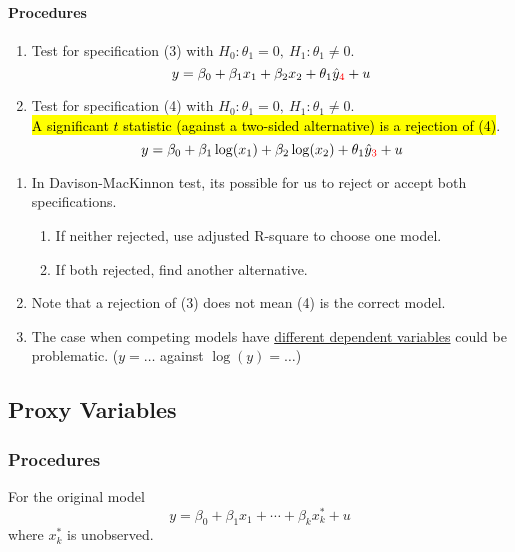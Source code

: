 \documentclass[]{article}
\begin{document}
			\paragraph{Procedures}
			\begin{enumerate}
				\item Test for specification (3) with $H_0: \theta_1=0,\ H_1: \theta_1 \neq 0$.
					\begin{equation}
						y = \beta_0 + \beta_1 x_1 + \beta_2 x_2 + \theta_1 \hat{y}_{\textcolor{red}{4}} + u
					\end{equation}
				\item Test for specification (4) with $H_0: \theta_1=0,\ H_1: \theta_1 \neq 0$. \\ \hl{A significant $t$ statistic (against a two-sided alternative) is a rejection of (4)}.
					\begin{equation}
						y = \beta_0 + \beta_1 \log(x_1) + \beta_2 \log(x_2) + \theta_1 \hat{y}_{\textcolor{red}{3}} + u
					\end{equation}
			\end{enumerate}
			
			\begin{remark}[Porblems] \quad
				\begin{enumerate}
					\item In Davison-MacKinnon test, its possible for us to reject or accept both specifications.
					\begin{enumerate}
						\item If neither rejected, use adjusted R-square to choose one model.
						\item If both rejected, find another alternative.
					\end{enumerate}
					\item Note that a rejection of (3) does not mean (4) is the correct model.
					\item The case when competing models have \ul{different dependent variables} could be problematic. ($y = \dots $ against $\log(y) = \dots$)
				\end{enumerate}
			\end{remark}
		\subsection{Proxy Variables}
			\subsubsection{Procedures}
				\par For the original model
				\begin{equation}
					y = \beta_0 + \beta_1 x_1 + \cdots + \beta_k x_k^{*} + u
				\end{equation}
				where $x_k^{*}$ is unobserved. \\
				
\end{document}
